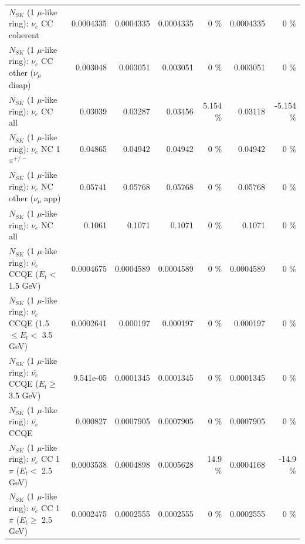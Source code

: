\begin{table}
\begin{tabular}{| l | r | r | r  r | r  r |}
                               $N_{SK}$ (1 $\mu$-like ring): $\nu_e$ CC coherent &       0.0004335 &       0.0004335 &       0.0004335 &        0 \%  &       0.0004335 &        0 \%  \\ 
                $N_{SK}$ (1 $\mu$-like ring): $\nu_e$ CC other ($\nu_\mu$ disap) &        0.003048 &        0.003051 &        0.003051 &        0 \%  &        0.003051 &        0 \%  \\ 
                                  $N_{SK}$ (1 $\mu$-like ring): $\nu_{e}$ CC all &         0.03039 &         0.03287 &         0.03456 &    5.154 \%  &         0.03118 &   -5.154 \%  \\ 
\hline
                           $N_{SK}$ (1 $\mu$-like ring): $\nu_e$ NC 1$\pi^{+/-}$ &         0.04865 &         0.04942 &         0.04942 &        0 \%  &         0.04942 &        0 \%  \\ 
                  $N_{SK}$ (1 $\mu$-like ring): $\nu_e$ NC other ($\nu_\mu$ app) &         0.05741 &         0.05768 &         0.05768 &        0 \%  &         0.05768 &        0 \%  \\ 
                                  $N_{SK}$ (1 $\mu$-like ring): $\nu_{e}$ NC all &          0.1061 &          0.1071 &          0.1071 &        0 \%  &          0.1071 &        0 \%  \\ 
\hline
\hline
\hline
            $N_{SK}$ (1 $\mu$-like ring): $\bar{\nu_e}$ CCQE ($E_{t} <$ 1.5 GeV) &       0.0004675 &       0.0004589 &       0.0004589 &        0 \%  &       0.0004589 &        0 \%  \\ 
   $N_{SK}$ (1 $\mu$-like ring): $\bar{\nu_e}$ CCQE (1.5 $\leq E_{t} <$ 3.5 GeV) &       0.0002641 &        0.000197 &        0.000197 &        0 \%  &        0.000197 &        0 \%  \\ 
         $N_{SK}$ (1 $\mu$-like ring): $\bar{\nu_e}$ CCQE ($E_{t} \geq$ 3.5 GeV) &       9.541e-05 &       0.0001345 &       0.0001345 &        0 \%  &       0.0001345 &        0 \%  \\ 
\hline
                                $N_{SK}$ (1 $\mu$-like ring): $\bar{\nu_e}$ CCQE &        0.000827 &       0.0007905 &       0.0007905 &        0 \%  &       0.0007905 &        0 \%  \\ 
\hline
       $N_{SK}$ (1 $\mu$-like ring): $\bar{\nu_e}$ CC 1$\pi$ ($E_{t} <$ 2.5 GeV) &       0.0003538 &       0.0004898 &       0.0005628 &     14.9 \%  &       0.0004168 &    -14.9 \%  \\ 
    $N_{SK}$ (1 $\mu$-like ring): $\bar{\nu_e}$ CC 1$\pi$ ($E_{t} \geq$ 2.5 GeV) &       0.0002475 &       0.0002555 &       0.0002555 &        0 \%  &       0.0002555 &        0 \%  \\ 

\end{tabular}
\end{table}
